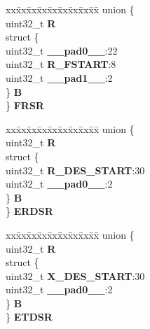 \begin{DoxyCompactItemize}
\begin{tabbing}
\end{tabbing}\item 
\mbox{\label{structFEC__tag_af3f1738a077707995b1bfac12a25b71d}} 
\begin{tabbing}
xx\=xx\=xx\=xx\=xx\=xx\=xx\=xx\=xx\=\kill
union \{\\
\>uint32\_t {\bfseries R}\\
\>struct \{\\
\>\>uint32\_t {\bfseries \_\_pad0\_\_}:22\\
\>\>uint32\_t {\bfseries R\_FSTART}:8\\
\>\>uint32\_t {\bfseries \_\_pad1\_\_}:2\\
\>\} {\bfseries B}\\
\} {\bfseries FRSR}\\

\end{tabbing}\item 
\mbox{\label{structFEC__tag_aa68b856e09f624695e7bc7bcfb9b5bcf}} 
\begin{tabbing}
xx\=xx\=xx\=xx\=xx\=xx\=xx\=xx\=xx\=\kill
union \{\\
\>uint32\_t {\bfseries R}\\
\>struct \{\\
\>\>uint32\_t {\bfseries R\_DES\_START}:30\\
\>\>uint32\_t {\bfseries \_\_pad0\_\_}:2\\
\>\} {\bfseries B}\\
\} {\bfseries ERDSR}\\

\end{tabbing}\item 
\mbox{\label{structFEC__tag_abd6786c19c3c8a8e5bd2a23a4f29eeb0}} 
\begin{tabbing}
xx\=xx\=xx\=xx\=xx\=xx\=xx\=xx\=xx\=\kill
union \{\\
\>uint32\_t {\bfseries R}\\
\>struct \{\\
\>\>uint32\_t {\bfseries X\_DES\_START}:30\\
\>\>uint32\_t {\bfseries \_\_pad0\_\_}:2\\
\>\} {\bfseries B}\\
\} {\bfseries ETDSR}\\


\end{tabbing}
\end{DoxyCompactItemize}
